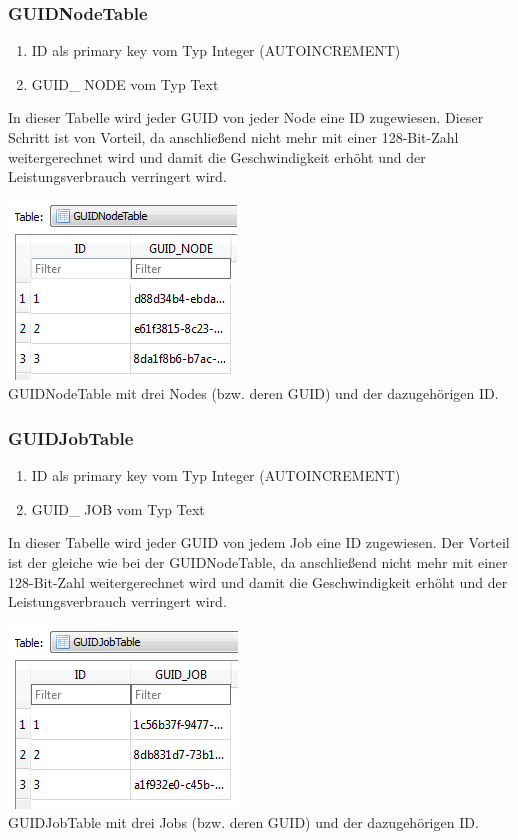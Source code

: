 \documentclass[12pt,a4paper]{report}
\begin{document}
\begin{onehalfspace}
\subsubsection{GUIDNodeTable}
\begin{enumerate}
\item ID als primary key vom Typ Integer (AUTOINCREMENT)
\item GUID\_ NODE vom Typ Text
\end{enumerate}
In dieser Tabelle wird jeder GUID von jeder Node eine ID zugewiesen. Dieser Schritt ist von Vorteil, da anschließend nicht mehr mit einer 128-Bit-Zahl weitergerechnet wird und damit die Geschwindigkeit erhöht und der Leistungsverbrauch verringert wird.
\begin{center}
\includegraphics[scale=0.8]{img/db-tb-guid-node.png}\\
GUIDNodeTable mit drei Nodes (bzw. deren GUID) und der dazugehörigen ID.
\end{center}
\subsubsection{GUIDJobTable}
\begin{enumerate}
\item ID als primary key vom Typ Integer (AUTOINCREMENT)
\item GUID\_ JOB vom Typ Text
\end{enumerate}
In dieser Tabelle wird jeder GUID von jedem Job eine ID zugewiesen. Der Vorteil ist der gleiche wie bei der GUIDNodeTable, da anschließend nicht mehr mit einer 128-Bit-Zahl weitergerechnet wird und damit die Geschwindigkeit erhöht und der Leistungsverbrauch verringert wird.
\begin{center}
\includegraphics[scale=0.8]{img/db-tb-guid-job.png}\\
GUIDJobTable mit drei Jobs (bzw. deren GUID) und der dazugehörigen ID. 
\end{center}

\end{onehalfspace}
\end{document}
